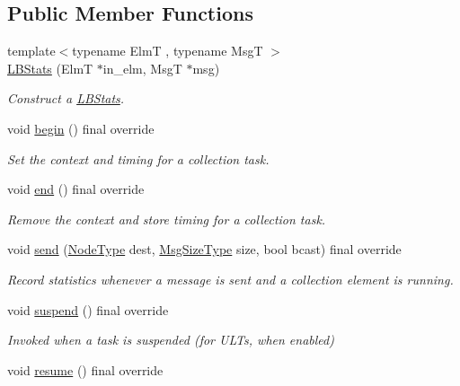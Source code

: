 \subsection*{Public Member Functions}
\begin{DoxyCompactItemize}
\item 
{\footnotesize template$<$typename ElmT , typename MsgT $>$ }\\\hyperlink{structvt_1_1ctx_1_1_l_b_stats_aa1212c9a206b738a146981acbc48327d}{L\+B\+Stats} (ElmT $\ast$in\+\_\+elm, MsgT $\ast$msg)
\begin{DoxyCompactList}\small\item\em Construct a {\ttfamily \hyperlink{structvt_1_1ctx_1_1_l_b_stats}{L\+B\+Stats}}. \end{DoxyCompactList}\item 
void \hyperlink{structvt_1_1ctx_1_1_l_b_stats_a209aad8645b7e7a4328b71c29f935da4}{begin} () final override
\begin{DoxyCompactList}\small\item\em Set the context and timing for a collection task. \end{DoxyCompactList}\item 
void \hyperlink{structvt_1_1ctx_1_1_l_b_stats_a55efc4d1d6eb579943b5b39d2a823328}{end} () final override
\begin{DoxyCompactList}\small\item\em Remove the context and store timing for a collection task. \end{DoxyCompactList}\item 
void \hyperlink{structvt_1_1ctx_1_1_l_b_stats_af8d33aaf1858c87072cfbc19c5d649a8}{send} (\hyperlink{namespacevt_a866da9d0efc19c0a1ce79e9e492f47e2}{Node\+Type} dest, \hyperlink{namespacevt_a408e86a8c7c89309b52907dc5a513924}{Msg\+Size\+Type} size, bool bcast) final override
\begin{DoxyCompactList}\small\item\em Record statistics whenever a message is sent and a collection element is running. \end{DoxyCompactList}\item 
void \hyperlink{structvt_1_1ctx_1_1_l_b_stats_a15d4c77ea06465f8e3a0b51c90bc6ddc}{suspend} () final override
\begin{DoxyCompactList}\small\item\em Invoked when a task is suspended (for U\+L\+Ts, when enabled) \end{DoxyCompactList}\item 
void \hyperlink{structvt_1_1ctx_1_1_l_b_stats_a099850f1bd53aafe650ed9e3958ca54b}{resume} () final override

\end{DoxyCompactItemize}
